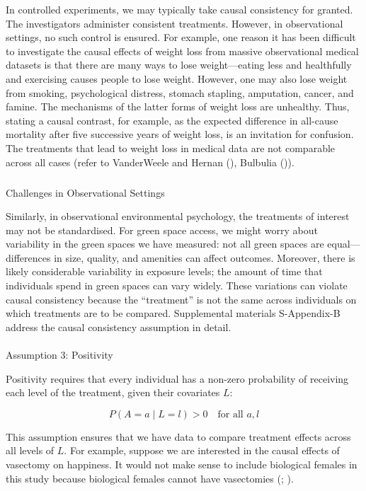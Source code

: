 \documentclass[
  singlecolumn]{article}
\makeatletter
\let\oldparagraph\paragraph
\renewcommand{\paragraph}{
    \@ifstar
      \xxxParagraphStar
      \xxxParagraphNoStar
  }
\newcommand{\xxxParagraphStar}[1]{\oldparagraph*{#1}\mbox{}}
\newcommand{\xxxParagraphNoStar}[1]{\oldparagraph{#1}\mbox{}}
\let\oldsubparagraph\subparagraph
\renewcommand{\subparagraph}{
    \@ifstar
      \xxxSubParagraphStar
      \xxxSubParagraphNoStar
  }
\newcommand{\xxxSubParagraphStar}[1]{\oldsubparagraph*{#1}\mbox{}}
\newcommand{\xxxSubParagraphNoStar}[1]{\oldsubparagraph{#1}\mbox{}}
\makeatother
\begin{document}
In controlled experiments, we may typically take causal consistency for
granted. The investigators administer consistent treatments. However, in
observational settings, no such control is ensured. For example, one
reason it has been difficult to investigate the causal effects of weight
loss from massive observational medical datasets is that there are many
ways to lose weight---eating less and healthfully and exercising causes
people to lose weight. However, one may also lose weight from smoking,
psychological distress, stomach stapling, amputation, cancer, and
famine. The mechanisms of the latter forms of weight loss are unhealthy.
Thus, stating a causal contrast, for example, as the expected difference
in all-cause mortality after five successive years of weight loss, is an
invitation for confusion. The treatments that lead to weight loss in
medical data are not comparable across all cases (refer to VanderWeele
and Hernan (), Bulbulia
()).

\subparagraph{Challenges in Observational
Settings}\label{challenges-in-observational-settings-1}

Similarly, in observational environmental psychology, the treatments of
interest may not be standardised. For green space access, we might worry
about variability in the green spaces we have measured: not all green
spaces are equal---differences in size, quality, and amenities can
affect outcomes. Moreover, there is likely considerable variability in
exposure levels; the amount of time that individuals spend in green
spaces can vary widely. These variations can violate causal consistency
because the ``treatment'' is not the same across individuals on which
treatments are to be compared. Supplemental materials S-Appendix-B
address the causal consistency assumption in detail.

\paragraph{Assumption 3: Positivity}\label{assumption-3-positivity}

Positivity requires that every individual has a non-zero probability of
receiving each level of the treatment, given their covariates \(L\):

\[
P(A = a \mid L = l) > 0 \quad \text{for all } a, l
\]

This assumption ensures that we have data to compare treatment effects
across all levels of \(L\). For example, suppose we are interested in
the causal effects of vasectomy on happiness. It would not make sense to
include biological females in this study because biological females
cannot have vasectomies (; ).
\end{document}
